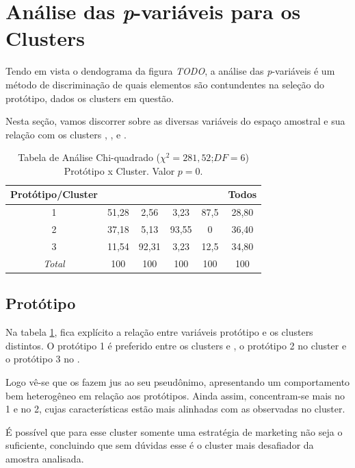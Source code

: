 \section{Análise das \emph{p}-variáveis para os Clusters}

Tendo em vista o dendograma da figura \emph{TODO}, a análise das \emph{p}-variáveis
é um método de discriminação de quais elementos são contundentes na
seleção do protótipo, dados os clusters em questão. 

Nesta seção, vamos discorrer sobre as diversas variáveis do espaço
amostral e sua relação com os clusters \emph{\nomeCa{}}, \emph{\nomeCb{}}, \emph{\nomeCc{}}
e \emph{\nomeCd{}}.
\begin{table}
\begin{centering}
\begin{tabular}{c|c|c|c|c|c}
\hline 
Protótipo/Cluster & \nomeCa{} & \nomeCb{} & \nomeCc{} & \nomeCd{} & Todos\tabularnewline
\hline 
1 & 51,28 & 2,56 & 3,23 & 87,5 & 28,80\tabularnewline
\hline 
2 & 37,18 & 5,13 & 93,55 & 0 & 36,40\tabularnewline
\hline 
3 & 11,54 & 92,31 & 3,23 & 12,5 & 34,80\tabularnewline
\hline 
\emph{Total} & 100 & 100 & 100 & 100 & 100\tabularnewline
\hline 
\end{tabular}
\par\end{centering}

\caption{\label{tab:prototipo-vs-cluster}Tabela de Análise Chi-quadrado ($\chi^{2}=281,52$;$DF=6$)
Protótipo x Cluster. Valor $p=0$.}
\end{table}

\subsection{Protótipo}

Na tabela \ref{tab:prototipo-vs-cluster}, fica explícito a relação
entre variáveis protótipo e os clusters distintos. O protótipo 1 é
preferido entre os clusters \emph{\nomeCa{}} e \emph{\nomeCd{}},
o protótipo 2 no cluster \emph{\nomeCc{}} e o protótipo 3 no \emph{\nomeCb{}}.

Logo vê-se que os \emph{\nomeCa{}} fazem jus ao seu pseudônimo, apresentando
um comportamento bem heterogêneo em relação aos protótipos. Ainda
assim, concentram-se mais no 1 e no 2, cujas características estão
mais alinhadas com as observadas no cluster. 

É possível que para esse cluster somente uma estratégia de marketing
não seja o suficiente, concluindo que sem dúvidas esse é o cluster
mais desafiador da amostra analisada.

